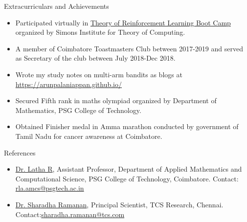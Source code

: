 \documentclass{resume} %
\begin{document}
\begin{rSection}{Extracurriculars and Achievements}
\vspace*{0.1in}
\begin{itemize}[leftmargin=*]
\item Participated virtually in \href{https://simons.berkeley.edu/workshops/rl-2020-bc}{Theory of Reinforcement Learning Boot Camp} organized by Simons Institute for Theory of Computing.
\item A member of Coimbatore Toastmasters Club between 2017-2019 and served as Secretary of the club between July 2018-Dec 2018.
\item Wrote my study notes on multi-arm bandits as blogs at \href{https://arunpalaniappan.github.io/}{https://arunpalaniappan.github.io/}
\item Secured Fifth rank in maths olympiad organized by Department of Mathematics, PSG College of Technology.
\item Obtained Finisher medal in Amma marathon conducted by government of Tamil Nadu for cancer awareness at Coimbatore.
\end{itemize}
\end{rSection}

\begin{rSection}{References}
\begin{itemize}[leftmargin=*]
\item \href{https://www.psgtech.edu/facgen.php?id=C3150}{Dr. Latha R}, Assistant Professor,  Department of Applied Mathematics and Computational Science, PSG College of Technology, Coimbatore. Contact: \href{mailto:rla.amcs@psgtech.ac.in}{rla.amcs@psgtech.ac.in}
\item \href{https://www.linkedin.com/in/sharadha-ramanan-43bb4946/}{Dr. Sharadha Ramanan}, Principal Scientist, TCS Research, Chennai. Contact:\href{mailto:sharadha.ramanan@tcs.com}{sharadha.ramanan@tcs.com}
\end{itemize}
\end{rSection}

\end{document}
